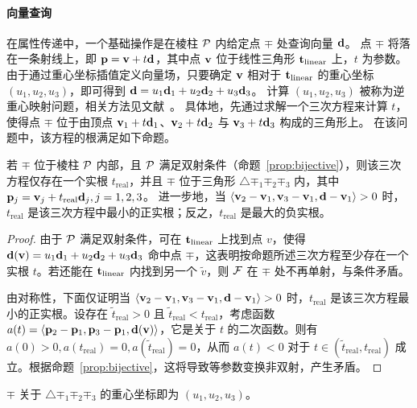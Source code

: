 \paragraph{向量查询}
在属性传递中，一个基础操作是在棱柱 $\mathcal{P}$ 内给定点 $\mp$ 处查询向量 $\mathbf{d}$。
%
点 $\mp$ 将落在一条射线上，即 $\mathbf{p} = \mathbf{v} + t \mathbf{d}$，其中点 $\mathbf{v}$ 位于线性三角形 $\mathbf{t}_{\text{linear}}$ 上，$t$ 为参数。
%
由于通过重心坐标插值定义向量场，只要确定 $\mathbf{v}$ 相对于 $\mathbf{t}_{\text{linear}}$ 的重心坐标 $(u_1, u_2, u_3)$，即可得到 $\mathbf{d} = u_1 \mathbf{d}_1+u_2 \mathbf{d}_2+ u_3 \mathbf{d}_3$。
%
计算 $(u_1, u_2, u_3)$ 被称为逆重心映射问题，相关方法见文献~\cite{Maggiordomo2023TheIB}。
%
具体地，先通过求解一个三次方程来计算 $t$，使得点 $\mp$ 位于由顶点 $\mathbf{v}_1+ t \mathbf{d}_1$、$\mathbf{v}_2+ t \mathbf{d}_2$ 与 $\mathbf{v}_3 + t \mathbf{d}_3$ 构成的三角形上。
%
在该问题中，该方程的根满足如下命题。
\begin{proposition}\label{prop:vector-query}
  若 $\mp$ 位于棱柱 $\mathcal{P}$ 内部，且 $\mathcal{P}$ 满足双射条件（命题~\ref{prop:bijective}），则该三次方程仅存在一个实根 $t_\text{real}$，并且 $\mp$ 位于三角形 $\triangle\mp_1\mp_2\mp_3$ 内，其中 $\mathbf{p}_j = \mathbf{v}_j + t_\text{real} \mathbf{d}_j, j=1,2,3$。 %
  进一步地，当 $\left\langle\mathbf{v}_2-\mathbf{v}_1,\mathbf{v}_3-\mathbf{v}_1,\mathbf{d}-\mathbf{v}_1\right\rangle>0$ 时，$t_\text{real}$ 是该三次方程中最小的正实根；反之，\( t_{\text{real}} \) 是最大的负实根。
\end{proposition}
\begin{proof}
由于 $\mathcal{P}$ 满足双射条件，可在 $\mathbf{t}_{\text{linear}}$ 上找到点 $v$，使得 $\mathbf{d}(\mathbf{v}) = u_1 \mathbf{d}_1+u_2 \mathbf{d}_2+ u_3 \mathbf{d}_3$ 命中点 $\mp$，这表明按命题所述三次方程至少存在一个实根 $t$。若还能在 $\mathbf{t}_{\text{linear}}$ 内找到另一个 $\tilde{v}$，则 $\mathcal{F}$ 在 $\mp$ 处不再单射，与条件矛盾。

由对称性，下面仅证明当 $\left\langle\mathbf{v}_2-\mathbf{v}_1,\mathbf{v}_3-\mathbf{v}_1,\mathbf{d}-\mathbf{v}_1\right\rangle>0$ 时，$t_\text{real}$ 是该三次方程最小的正实根。设存在 $\tilde{t}_{\text{real}}>0$ 且 $\tilde{t}_{\text{real}}<t_{\text{real}}$，考虑函数 $a(t)=\left \langle \mathbf{p}_2-\mathbf{p}_1,\mathbf{p}_3-\mathbf{p}_1,\mathbf{d}(\mathbf{v})\right \rangle$，它是关于 $t$ 的二次函数。则有 $a(0)>0,a(t_{\text{real}})=0,a(\tilde{t}_{\text{real}})=0$，从而 $a(t)<0$ 对于 $t\in (\tilde{t}_{\text{real}},t_{\text{real}})$ 成立。根据命题~\ref{prop:bijective}，这将导致等参数变换非双射，产生矛盾。
\end{proof}
$\mp$ 关于 $\triangle\mp_1\mp_2\mp_3$ 的重心坐标即为 $(u_1, u_2, u_3)$。



